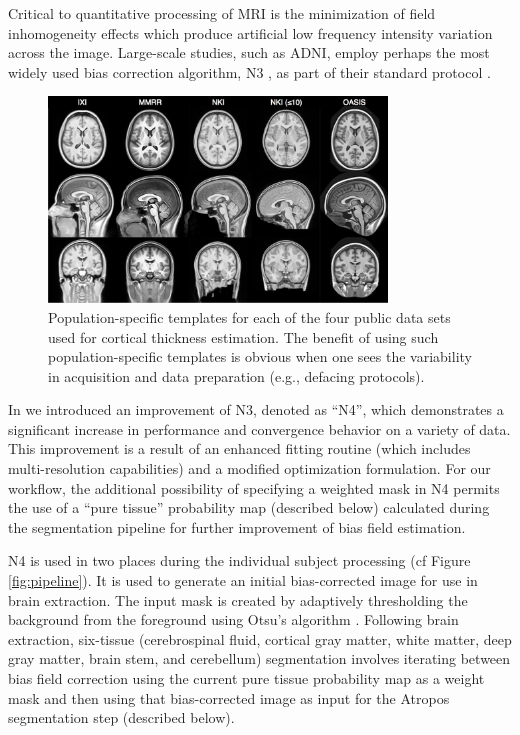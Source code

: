 Critical to quantitative processing of MRI is the minimization of
field inhomogeneity effects which produce artificial low frequency 
intensity variation across the image.  Large-scale studies, such
as ADNI, employ
perhaps the most widely used bias correction algorithm, N3 \citep{sled1998}, 
as part of their standard protocol \citep{boyes2008}.


\begin{figure}
  \centering
  \includegraphics[width=90mm]{Figures/templates.jpg}
  \caption{Population-specific templates for each of the four public data sets used
  for cortical thickness 
  estimation. %
  The benefit of using such population-specific templates is obvious when one sees the variability in
  acquisition and data preparation (e.g., defacing protocols).
  }
  \label{fig:template}
\end{figure}

In \cite{tustison2010} we introduced an improvement of N3, denoted as
``N4'', which demonstrates a significant increase in performance and convergence behavior on a variety of data. 
This improvement is a result of an enhanced
fitting routine (which includes multi-resolution capabilities) and a modified optimization 
formulation.  For our workflow, the additional possibility of specifying
a weighted mask in N4 permits the use of a ``pure tissue'' probability map 
(described below)
calculated during the segmentation pipeline for further improvement of 
bias field estimation.  

N4 is used in two places during the individual subject processing (cf Figure
\ref{fig:pipeline}).  
It is used to generate an initial bias-corrected image for use in
brain extraction.  The input mask is created by adaptively thresholding 
the background from the foreground using Otsu's algorithm \citep{otsu1979}.
Following brain extraction, six-tissue (cerebrospinal fluid, cortical gray 
matter, white matter, deep gray matter, brain stem, and cerebellum)
segmentation involves iterating
between bias field correction using the current pure tissue 
probability map as a weight mask and then using that bias-corrected image
as input for the Atropos segmentation step (described below).


